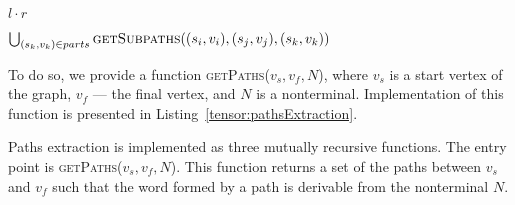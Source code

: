 \begin{algorithm}[h]
\begin{algorithmic}[1]
    \State \Return $l \cdot r$
\EndFunction

    \State \Return $\bigcup_{(s_k,v_k) \in parts} \Call{getSubpaths}{(s_i,v_i), (s_j,v_j),(s_k,v_k)}$
\EndFunction
\end{algorithmic}
\end{algorithm}

To do so, we provide a function \textsc{getPaths}($v_s, v_f, N$), where $v_s$ is a start vertex of the graph, $v_f$ --- the final vertex, and $N$ is a nonterminal.
Implementation of this function is presented in Listing~\ref{tensor:pathsExtraction}.

Paths extraction is implemented as three mutually recursive functions.
The entry point is \textsc{getPaths}($v_s, v_f, N$).
This function returns a set of the paths between $v_s$ and $v_f$ such that the word formed by a path is derivable from the nonterminal $N$.

